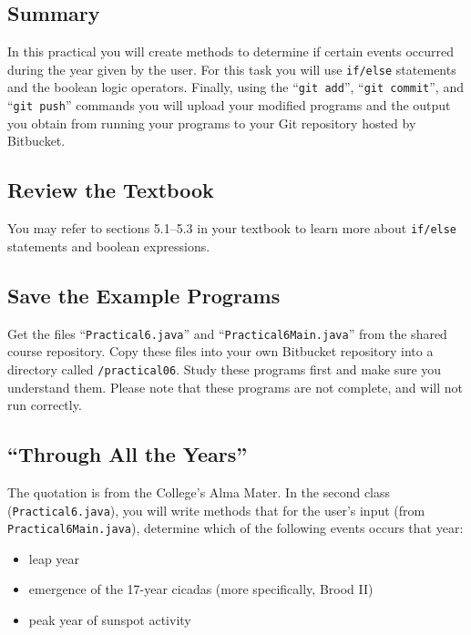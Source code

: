 



\subsection*{Summary}
\vspace*{-.05in}

In this practical you will create methods to determine if certain events occurred during the year given by the user. For
this task you will use {\tt if/else} statements and the boolean logic operators.  Finally, using the ``{\tt git add}'',
``{\tt git  commit}'', and ``{\tt git push}'' commands you will upload your modified programs and the output you obtain
from running your programs to your Git repository hosted by Bitbucket.  

\vspace*{-.1in}
\subsection*{Review the Textbook}
\vspace*{-.05in}

You may refer to sections 5.1--5.3 in your textbook to learn more about {\tt if/else} statements and boolean expressions. 

\vspace*{-.1in}
\subsection*{Save the Example Programs}
\vspace*{-.05in}
Get the files ``{\tt Practical6.java}'' and ``{\tt Practical6Main.java}'' from the shared course repository. Copy these files 
into your own Bitbucket repository into a directory called {\tt /practical06}. Study 
these programs first and make sure you understand them. Please note that these programs are not complete, and will not run correctly.

\vspace*{-.1in}
\subsection*{``Through All the Years''}
\vspace*{-.05in}
The quotation is from the College's Alma Mater. In the second class ({\tt Practical6.java}), you will write methods that for the user's input (from {\tt Practical6Main.java}), determine 
which of the following events occurs that year:
\begin{itemize}
\item
leap year
\item
emergence of the 17-year cicadas (more specifically, Brood II)
\item
peak year of sunspot activity
\end{itemize}

